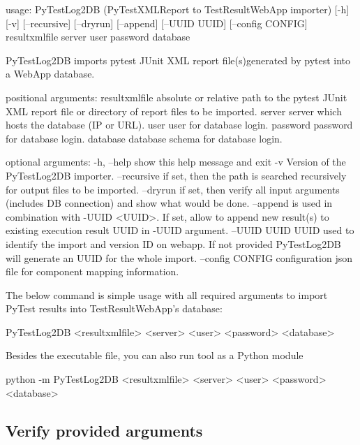 \begin{robotlog}
usage: PyTestLog2DB (PyTestXMLReport to TestResultWebApp importer) [-h] [-v]
                    [--recursive] [--dryrun] [--append] [--UUID UUID]
                    [--config CONFIG] resultxmlfile server user password database

PyTestLog2DB imports pytest JUnit XML report file(s)generated by pytest into a WebApp database.

positional arguments:
resultxmlfile    absolute or relative path to the pytest JUnit XML report
                 file or directory of report files to be imported.
server           server which hosts the database (IP or URL).
user             user for database login.
password         password for database login.
database         database schema for database login.

optional arguments:
-h, --help       show this help message and exit
-v               Version of the PyTestLog2DB importer.
--recursive      if set, then the path is searched recursively for output
                 files to be imported.
--dryrun         if set, then verify all input arguments (includes DB connection)
                 and show what would be done.
--append         is used in combination with -UUID <UUID>. If set, allow to append
                 new result(s) to existing execution result UUID in -UUID argument.
--UUID UUID      UUID used to identify the import and version ID on webapp.
                 If not provided PyTestLog2DB will generate an UUID for the whole import.
--config CONFIG  configuration json file for component mapping information.
\end{robotlog}

The below command is simple usage with all required arguments to import
PyTest results into TestResultWebApp's database:

\begin{robotlog}
PyTestLog2DB <resultxmlfile> <server> <user> <password> <database>
\end{robotlog}

Besides the executable file, you can also run tool as a Python module

\begin{robotlog}
python -m PyTestLog2DB <resultxmlfile> <server> <user> <password> <database>
\end{robotlog}

\hypertarget{verify-provided-arguments}{%
\subsection{Verify provided arguments}\label{verify-provided-arguments}}

